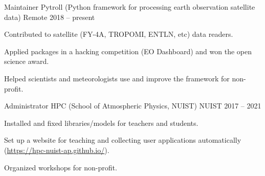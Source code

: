 

\begin{cventries}

  \cventry
    {Maintainer} %
    {Pytroll (Python framework for processing earth observation satellite data)} %
    {Remote} %
    {2018 -- present} %
    {
      \begin{cvitems} %
        \item {Contributed to satellite (FY-4A, TROPOMI, ENTLN, etc) data readers.}
        \item {Applied packages in a hacking competition (EO Dashboard) and won the open science award.}
        \item {Helped scientists and meteorologists use and improve the framework for non-profit.}
      \end{cvitems}
    }

  \cventry
    {Administrator} %
    {HPC (School of Atmospheric Physics, NUIST)} %
    {NUIST} %
    {2017 -- 2021} %
    {
      \begin{cvitems} %
        \item {Installed and fixed libraries/models for teachers and students.}
        \item {Set up a website for teaching and collecting user applications automatically (\url{https://hpc-nuist-ap.github.io/}).}
        \item {Organized workshops for non-profit.}
      \end{cvitems}
    }

\end{cventries}
